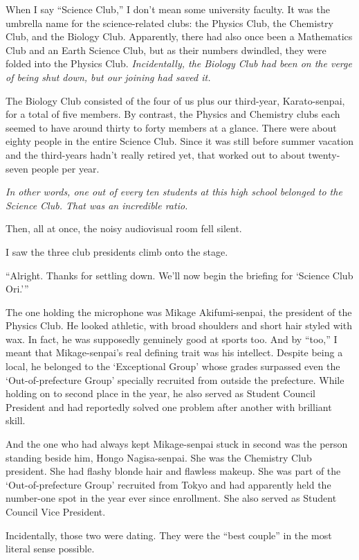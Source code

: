 \documentclass[
    a4paper,
    12pt,
    twoside,
    openany,
    UTF8,
    fontset=windows
]{ctexbook}
\begin{document}
When I say ``Science Club,'' I don't mean some university faculty. It was the umbrella name for the science-related clubs: the Physics Club, the Chemistry Club, and the Biology Club. Apparently, there had also once been a Mathematics Club and an Earth Science Club, but as their numbers dwindled, they were folded into the Physics Club. \textit{Incidentally, the Biology Club had been on the verge of being shut down, but our joining had saved it.}

The Biology Club consisted of the four of us plus our third-year, Karato-senpai, for a total of five members. By contrast, the Physics and Chemistry clubs each seemed to have around thirty to forty members at a glance. There were about eighty people in the entire Science Club. Since it was still before summer vacation and the third-years hadn't really retired yet, that worked out to about twenty-seven people per year.

\textit{In other words, one out of every ten students at this high school belonged to the Science Club. That was an incredible ratio.}

Then, all at once, the noisy audiovisual room fell silent.

I saw the three club presidents climb onto the stage.

``Alright. Thanks for settling down. We'll now begin the briefing for `Science Club Ori.'''

The one holding the microphone was Mikage Akifumi-senpai, the president of the Physics Club. He looked athletic, with broad shoulders and short hair styled with wax. In fact, he was supposedly genuinely good at sports too. And by ``too,'' I meant that Mikage-senpai's real defining trait was his intellect. Despite being a local, he belonged to the `Exceptional Group' whose grades surpassed even the `Out-of-prefecture Group' specially recruited from outside the prefecture. While holding on to second place in the year, he also served as Student Council President and had reportedly solved one problem after another with brilliant skill.

And the one who had always kept Mikage-senpai stuck in second was the person standing beside him, Hongo Nagisa-senpai. She was the Chemistry Club president. She had flashy blonde hair and flawless makeup. She was part of the `Out-of-prefecture Group' recruited from Tokyo and had apparently held the number-one spot in the year ever since enrollment. She also served as Student Council Vice President.

Incidentally, those two were dating. They were the ``best couple'' in the most literal sense possible.
\end{document}
